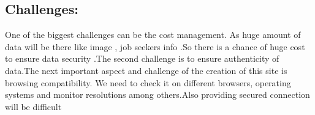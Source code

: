\documentclass{article}
\begin{document}
\subsection{Challenges:}
One of the biggest challenges can be the cost management. As huge amount of data will be there like image , job seekers info .So there is a chance of huge cost to ensure data security .The second challenge is to ensure authenticity of data.The next important aspect and challenge of the creation of this site is browsing compatibility. We need to check it on different browsers, operating systems and monitor resolutions among others.Also providing secured connection will
be difficult
\end{document}

